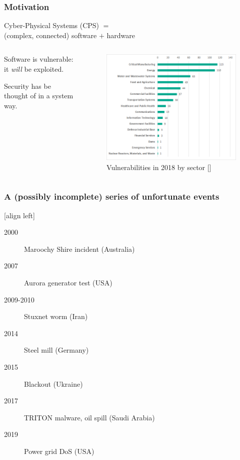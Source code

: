 \documentclass[presentation]{beamer}
\begin{document}
\begin{frame}
	\frametitle{Motivation}
	\begin{center}
		Cyber-Physical Systems (CPS) $=$ \\ (complex, connected) software $+$ hardware
	\end{center}
	\vspace{-1ex}
	\begin{columns}
		\begin{column}{0.35\textwidth}
			Software is vulnerable: it \emph{will} be exploited. 

			\vspace{3ex}
			Security has be thought of in a system way.
		\end{column}
		\begin{column}{0.64\textwidth}
			\begin{figure}
				\includegraphics[scale=0.44]{fig/vuln-report-ics-cert.png}
				\caption*{\scriptsize Vulnerabilities in 2018 by sector [\href{https://ics-cert.us-cert.gov/}{}]}
			\end{figure}
		\end{column}
	\end{columns}
\end{frame}

\begin{frame}
	\frametitle{A (possibly incomplete) series of unfortunate events}
	[align left]
	\begin{description}
		\item[2000] Maroochy Shire incident (Australia)
		\item[2007] Aurora generator test (USA)
		\item[2009-2010] Stuxnet worm (Iran)
		\item[2014] Steel mill (Germany)
		\item[2015] Blackout (Ukraine)
		\item[2017] TRITON malware, oil spill (Saudi Arabia)
		\item[2019] Power grid DoS (USA)  
	\end{description}
\end{frame}
\end{document}
